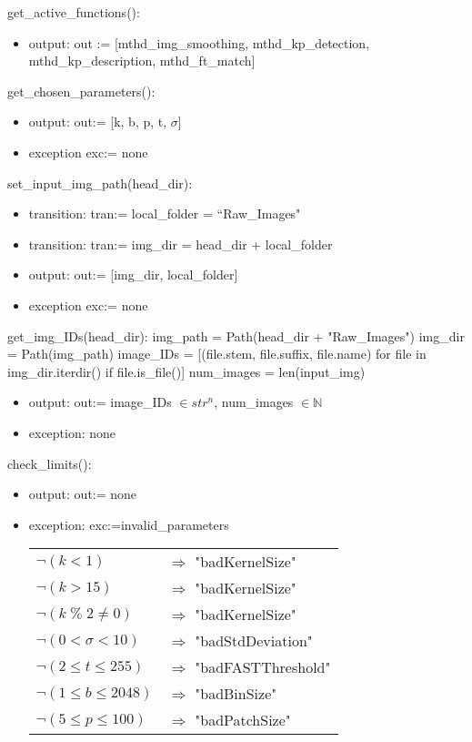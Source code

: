\documentclass[12pt, titlepage]{article}
\begin{document}
\noindent get\_active\_functions():
\begin{itemize}
  \item output: out := [mthd\_img\_smoothing, mthd\_kp\_detection, 
  mthd\_kp\_description, mthd\_ft\_match] 
\end{itemize}


\noindent get\_chosen\_parameters():
\begin{itemize}
  \item output: out:= [k, b, p, t,  $\sigma$]
  \item exception exc:= none
\end{itemize}


\noindent set\_input\_img\_path(head\_dir):
\begin{itemize}
  \item transition: tran:= local\_folder = ``Raw\_Images"
  \item transition: tran:= img\_dir = head\_dir + local\_folder
\end{itemize}
\begin{itemize}
  \item output: out:= [img\_dir, local\_folder]
  \item exception exc:= none
\end{itemize}


\noindent get\_img\_IDs(head\_dir): \newline \newline
img\_path = Path(head\_dir + "Raw\_Images") \newline
img\_dir = Path(img\_path) \newline
image\_IDs = [(file.stem, file.suffix, file.name) 
for file in img\_dir.iterdir() if file.is\_file()] \newline
num\_images = len(input\_img)
\begin{itemize}
\item output: out:= image\_IDs $\in str^{n}$, num\_images $\in \mathbb{N}$
\item exception: none 
\end{itemize}


\noindent check\_limits():
\begin{itemize}
  \item output: out:= none
  \item exception: exc:=invalid\_parameters\
  \noindent \begin{longtable*}[l]{l l} 
    $\neg (k < 1)$ & $\Rightarrow$ "badKernelSize"\\
    $\neg (k > 15)$ & $\Rightarrow$ "badKernelSize"\\
    $\neg (k \; \% \; 2 \neq 0)$ & $\Rightarrow$ "badKernelSize"\\
    $\neg (0 < \sigma < 10)$ & $\Rightarrow$ "badStdDeviation"\\
    $\neg (2 \leq t \leq 255)$ & $\Rightarrow$ "badFASTThreshold"\\
    $\neg (1 \leq b \leq 2048)$ & $\Rightarrow$ "badBinSize"\\
    $\neg (5 \leq p \leq 100)$ & $\Rightarrow$ "badPatchSize"\\
    \end{longtable*}
\end{itemize}
\end{document}
